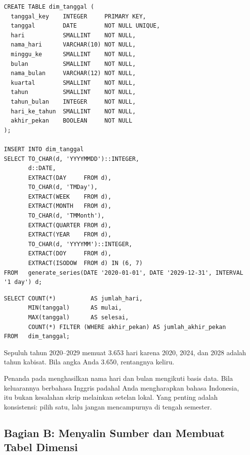\begin{lstlisting}[style=sqlgaya]
CREATE TABLE dim_tanggal (
  tanggal_key    INTEGER     PRIMARY KEY,
  tanggal        DATE        NOT NULL UNIQUE,
  hari           SMALLINT    NOT NULL,
  nama_hari      VARCHAR(10) NOT NULL,
  minggu_ke      SMALLINT    NOT NULL,
  bulan          SMALLINT    NOT NULL,
  nama_bulan     VARCHAR(12) NOT NULL,
  kuartal        SMALLINT    NOT NULL,
  tahun          SMALLINT    NOT NULL,
  tahun_bulan    INTEGER     NOT NULL,
  hari_ke_tahun  SMALLINT    NOT NULL,
  akhir_pekan    BOOLEAN     NOT NULL
);

INSERT INTO dim_tanggal
SELECT TO_CHAR(d, 'YYYYMMDD')::INTEGER,
       d::DATE,
       EXTRACT(DAY     FROM d),
       TO_CHAR(d, 'TMDay'),
       EXTRACT(WEEK    FROM d),
       EXTRACT(MONTH   FROM d),
       TO_CHAR(d, 'TMMonth'),
       EXTRACT(QUARTER FROM d),
       EXTRACT(YEAR    FROM d),
       TO_CHAR(d, 'YYYYMM')::INTEGER,
       EXTRACT(DOY     FROM d),
       EXTRACT(ISODOW  FROM d) IN (6, 7)
FROM   generate_series(DATE '2020-01-01', DATE '2029-12-31', INTERVAL '1 day') d;
\end{lstlisting}


\begin{lstlisting}[style=sqlgaya]
SELECT COUNT(*)          AS jumlah_hari,
       MIN(tanggal)      AS mulai,
       MAX(tanggal)      AS selesai,
       COUNT(*) FILTER (WHERE akhir_pekan) AS jumlah_akhir_pekan
FROM   dim_tanggal;
\end{lstlisting}

Sepuluh tahun 2020--2029 memuat 3.653 hari karena 2020, 2024, dan 2028 adalah
tahun kabisat. Bila angka Anda 3.650, rentangnya keliru.

\begin{peringatan}
Penanda  pada  menghasilkan nama hari dan bulan
mengikuti  basis data. Bila keluarannya berbahasa Inggris
padahal Anda mengharapkan bahasa Indonesia, itu bukan kesalahan skrip melainkan
setelan lokal. Yang penting adalah konsistensi: pilih satu, lalu jangan
mencampurnya di tengah semester.
\end{peringatan}

\subsection{Bagian B: Menyalin Sumber dan Membuat Tabel Dimensi}

